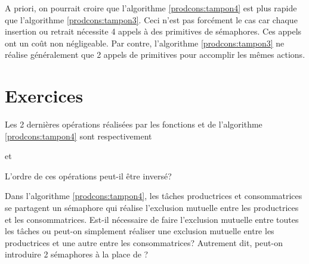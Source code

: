 A priori, on pourrait croire que l'algorithme \ref{prodcons:tampon4} est plus rapide que l'algorithme \ref{prodcons:tampon3}. Ceci n'est pas forcément le cas car chaque insertion ou retrait nécessite 4 appels à des primitives de sémaphores. Ces appels ont un coût non négligeable. Par contre, l'algorithme \ref{prodcons:tampon3} ne réalise généralement que 2 appels de primitives pour accomplir les mêmes actions.

\section{Exercices}

\startexercice

Les 2 dernières opérations réalisées par les fonctions  et  de l'algorithme \ref{prodcons:tampon4} sont respectivement \par
\hspace{1cm}  \par
\hspace{1cm}  \par
et \par
 \hspace{1cm}  \par
 \hspace{1cm}  \par
L'ordre de ces opérations peut-il être inversé?

\startexercice

Dans l'algorithme \ref{prodcons:tampon4}, les tâches productrices et consommatrices se partagent un sémaphore  qui réalise l'exclusion mutuelle entre les productrices et les consommatrices. Est-il nécessaire de faire l'exclusion mutuelle entre toutes les tâches ou peut-on simplement réaliser une exclusion mutuelle entre les productrices et une autre entre les consommatrices? Autrement dit, peut-on introduire 2 sémaphores à la place de ?
